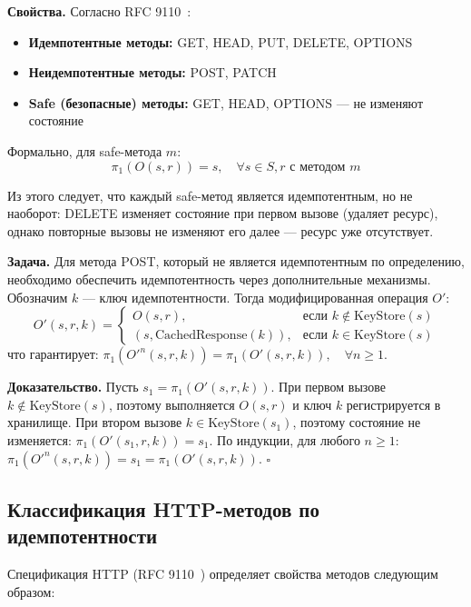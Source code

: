 \textbf{Свойства.} Согласно RFC 9110~\cite{rfc9110}:
\begin{itemize}
    \item \textbf{Идемпотентные методы:} GET, HEAD, PUT, DELETE, OPTIONS
    \item \textbf{Неидемпотентные методы:} POST, PATCH
    \item \textbf{Safe (безопасные) методы:} GET, HEAD, OPTIONS --- не изменяют состояние
\end{itemize}

Формально, для safe-метода $m$:
\begin{equation}
    \pi_1(O(s, r)) = s, \quad \forall s \in S, r \text{ с методом } m
\end{equation}

Из этого следует, что каждый safe-метод является идемпотентным, но не наоборот: DELETE изменяет состояние при первом вызове (удаляет ресурс), однако повторные вызовы не изменяют его далее --- ресурс уже отсутствует.

\textbf{Задача.} Для метода POST, который не является идемпотентным по определению, необходимо обеспечить идемпотентность через дополнительные механизмы. Обозначим $k$ --- ключ идемпотентности. Тогда модифицированная операция $O'$:
\begin{equation}
    O'(s, r, k) =
    \begin{cases}
        O(s, r), & \text{если } k \notin \text{KeyStore}(s) \\
        (s, \text{CachedResponse}(k)), & \text{если } k \in \text{KeyStore}(s)
    \end{cases}
\end{equation}
что гарантирует: $\pi_1(O'^n(s, r, k)) = \pi_1(O'(s, r, k)), \quad \forall n \geq 1$.

\textbf{Доказательство.} Пусть $s_1 = \pi_1(O'(s, r, k))$. При первом вызове $k \notin \text{KeyStore}(s)$, поэтому выполняется $O(s, r)$ и ключ $k$ регистрируется в хранилище. При втором вызове $k \in \text{KeyStore}(s_1)$, поэтому состояние не изменяется: $\pi_1(O'(s_1, r, k)) = s_1$. По индукции, для любого $n \geq 1$: $\pi_1(O'^n(s, r, k)) = s_1 = \pi_1(O'(s, r, k))$. $\square$

\subsection{Классификация HTTP-методов по идемпотентности}

Спецификация HTTP (RFC 9110~\cite{rfc9110}) определяет свойства методов следующим образом:

